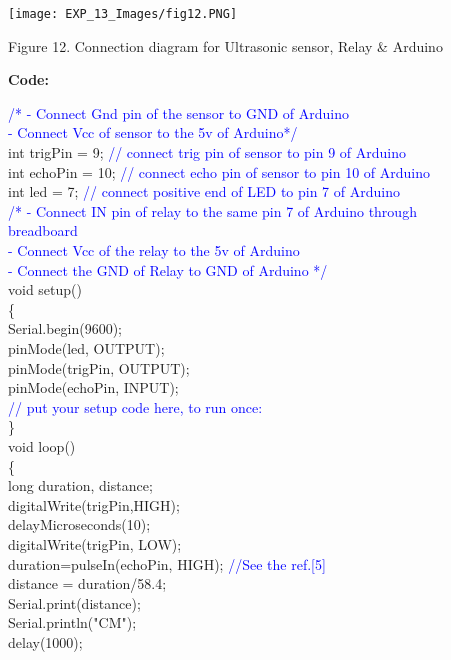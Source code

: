 \documentclass[12pt,a4paper]{article}
\begin{document}
\begin{center} 
\texttt{[image: EXP\_13\_Images/fig12.PNG]}
\end{center}
\vspace{-5mm}
\begin{center} {Figure 12. Connection diagram for Ultrasonic sensor, Relay \& Arduino}\end{center}
\vspace{-5mm}
\hspace{1.5cm}\textbf{\large Code:}\\[6pt]
\setlength{\parindent}{8eM}


\textcolor{blue}{/* - Connect Gnd pin of the sensor to GND of Arduino\\
    - Connect Vcc of sensor to the 5v of Arduino*/}\\
int trigPin = 9;\textcolor{blue}{ // connect trig pin of sensor to pin 9 of Arduino}\\
int echoPin = 10;  \textcolor{blue}{// connect echo pin of sensor to pin 10 of Arduino}\\
int led = 7; \textcolor{blue}{ // connect positive end of LED to pin 7 of Arduino}\\
\textcolor{blue}{/* - Connect IN pin of relay to the same pin 7 of Arduino through \\  breadboard\\
    - Connect Vcc of the relay to the 5v of Arduino\\
    - Connect the GND of Relay to GND of Arduino */}\\[6pt]
void setup()\\
\{\\
   Serial.begin(9600); \\
   pinMode(led, OUTPUT);\\
   pinMode(trigPin, OUTPUT);\\
   pinMode(echoPin, INPUT);\\
  \textcolor{blue}{// put your setup code here, to run once:}\\
 \}\\[6pt]

void loop()\\ 
\{\\
  long duration, distance;\\
  digitalWrite(trigPin,HIGH);\\
  delayMicroseconds(10);\\
  digitalWrite(trigPin, LOW);\\
  duration=pulseIn(echoPin, HIGH); \textcolor{blue}{//See the ref.[5]}\\
  distance = duration/58.4;\\
  Serial.print(distance);\\
  Serial.println("CM");\\
  delay(1000);\\
 
\end{document}
